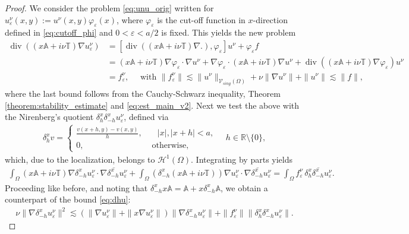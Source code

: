 \documentclass[report]{elsarticle}
\numberwithin{theorem}{section}
\newcommand{\re}{\varepsilon}
\begin{document}
\begin{proof}
	We consider the problem \eqref{eq:unu_orig} written for  $u^{\nu}_{\varepsilon}(x,y):=u^{\nu}(x,y)\varphi_{\varepsilon}(x)$, where $\varphi_{\varepsilon}$ is the cut-off function in $x$-direction defined in \eqref{eq:cutoff_phi} and $0<\re<a/2$ is fixed. This yields the new problem
	\begin{align}
		\nonumber
		\operatorname{div}\left((x\mathbb{A}+i\nu\mathbb{T})\nabla u^{\nu}_{\varepsilon}\right)&=[	\operatorname{div}\left((x\mathbb{A}+i\nu\mathbb{T})\nabla .\right), \varphi_{\varepsilon}]u^{\nu}+\varphi_{\varepsilon}f\\
		\nonumber
		&=(x\mathbb{A}+i\nu \mathbb{T})\nabla \varphi_{\varepsilon}\cdot \nabla u^{\nu}+\nabla \varphi_{\varepsilon}\cdot (x\mathbb{A}+i\nu \mathbb{T})\nabla u^{\nu}+\operatorname{div}((x\mathbb{A}+i\nu\mathbb{T})\nabla \varphi_{\re})u^{\nu}\\
		\label{eq:newpb}
		&=f_{\varepsilon}^{\nu},\quad \text{ with } \|f^{\nu}_{\re}\|\lesssim \|u^{\nu}\|_{\mathcal{V}_{sing}(\Omega)}+\nu\|\nabla u^{\nu}\|+\|u^{\nu}\|\lesssim \|f\|,		
	\end{align}
	where the last bound follows from the Cauchy-Schwarz inequality, Theorem \ref{theorem:stability_estimate} and \eqref{eq:est_main_v2}. Next we test the above with the Nirenberg's quotient $\delta_h^x \delta_{-h}^x u^{\nu}_{\varepsilon}$, defined via
	\begin{align*}
		\delta_h^x v=\left\{
		\begin{array}{ll}
			\frac{v(x+h,y)-v(x,y)}{h},& \quad |x|, |x+h|<a,\\
			0, & \text{ otherwise, }
		\end{array}
		\right.\quad h\in \mathbb{R}\setminus \{0\},
	\end{align*}
	which, due to the localization, belongs to $\mathcal{H}^1(\Omega)$.  Integrating by parts yields
	\begin{align*}
		\int_{\Omega}( x \mathbb{A}+i\nu\mathbb{T})\nabla \delta_{-h}^xu^{\nu}_{\re}\cdot\overline{\nabla \delta_{-h}^xu^{\nu}_{\re}}+\int_{\Omega}\left(\delta_{-h}^x \left(x  \mathbb{A}+i\nu \mathbb{T}\right)\right)\nabla u^{\nu}_{\re}\cdot\overline{\nabla \delta_{-h}^x u^{\nu}_{\re}}=\int_{\Omega}f^{\nu}_{\re}\,  \overline{\delta_h^x\delta_{-h}^xu^{\nu}_{\re}}.
	\end{align*}
	Proceeding like before, and noting that $\delta^{x}_{-h}x\mathbb{A}=\mathbb{A}+x\delta^x_{-h}\mathbb{A}$, we obtain a counterpart of the bound \eqref{eq:dhu}:
	\begin{align*}
		\nu\|\nabla \delta_{-h}^xu^{\nu}_{\varepsilon}\|^2\lesssim \left(\|\nabla u^{\nu}_{\varepsilon}\|+\|x\nabla u^{\nu}_{\varepsilon}\|\right)\|\nabla \delta_{-h}^xu^{\nu}_{\varepsilon}\|+\|f^{\nu}_{\re}\|\|\delta_{h}^x\delta_{-h}^xu^{\nu}_{\varepsilon}\|.

\end{align*}
\end{proof}
\end{document}

